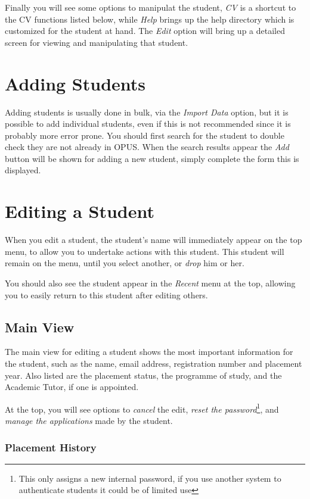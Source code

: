\documentclass[12 pt]{book}
\begin{document}
Finally you will see some options to manipulat the student, \emph{CV} is a
shortcut to the CV functions listed below, while \emph{Help} brings up the
help directory which is customized for the student at hand. The \emph{Edit}
option will bring up a detailed screen for viewing and manipulating that
student.

\section{Adding Students}

Adding students is usually done in bulk, via the \emph{Import Data} option,
but it is possible to add individual students, even if this is not recommended
since it is probably more error prone. You should first search for the student
to double check they are not already in OPUS. When the search results appear
the \emph{Add} button will be shown for adding a new student, simply complete
the form this is displayed.

\section{Editing a Student}

When you edit a student, the student's name will immediately appear on the 
top menu, to allow you to undertake actions with this student. This student
will remain on the menu, until you select another, or \emph{drop} him or her.

You should also see the student appear in the \emph{Recent} menu at the top,
allowing you to easily return to this student after editing others.

\subsection{Main View}

The main view for editing a student shows the most important information for
the student, such as the name, email address, registration number and placement
year. Also listed are the placement status, the programme of study, and the
Academic Tutor, if one is appointed.

At the top, you will see options to \emph{cancel} the edit, \emph{reset the
password}\footnote{This only assigns a new internal password, if you use
another system to authenticate students it could be of limited use}, and
\emph{manage the applications} made by the student.

\subsubsection{Placement History}
\end{document}
